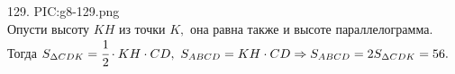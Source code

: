 129. {{PIC:g8-129.png}}\\
Опусти высоту $KH$ из точки $K,$ она равна также и высоте параллелограмма. Тогда $S_{\Delta CDK}=\cfrac{1}{2}\cdot KH\cdot CD,\ S_{ABCD}=KH\cdot CD\Rightarrow
S_{ABCD}=2S_{\Delta CDK}=56.$\\
